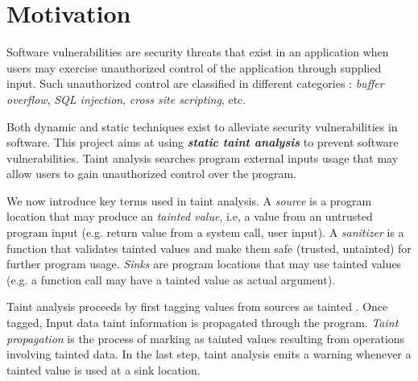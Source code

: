 \section{Motivation}

Software vulnerabilities are security threats
that exist in an application when users may exercise
unauthorized  control of the application through supplied input.
Such unauthorized control are classified in different
categories : \textit{buffer overflow}, \textit{SQL
injection}, \textit{cross site scripting}, etc.

Both dynamic and static techniques exist to alleviate
security vulnerabilities in software. 
This project aims at using \textit{\textbf{static taint analysis}}
to prevent software vulnerabilities.
Taint analysis searches program external inputs
usage that may allow users to gain unauthorized control
over the program. 

We now introduce key terms used in taint analysis.
A \textit{source} is a program location that may produce
an \textit{tainted value}, i.e, a value from an untrusted
program input (e.g. return value from a system call, user input). 
A \textit{sanitizer} is a function that validates tainted
values and make them safe (trusted, untainted) for further
program usage.
\textit{Sinks} are program locations that may use tainted
values (e.g. a function call may have a tainted value as
actual argument).

Taint analysis proceeds by first tagging values from sources
as tainted . Once tagged, Input data taint information is
propagated through the program.
\textit{Taint propagation} is the process of marking as tainted
values resulting from operations involving tainted data. In the
last step, taint analysis emits a warning whenever a tainted
value is used at a sink location.
